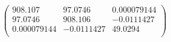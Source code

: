 \documentclass{article}
\begin{document}
\[\left(
\begin{array}{ccc}
 908.107 & 97.0746 & 0.000079144 \\
 97.0746 & 908.106 & -0.0111427 \\
 0.000079144 & -0.0111427 & 49.0294 \\
\end{array}
\right)\]
\end{document}
